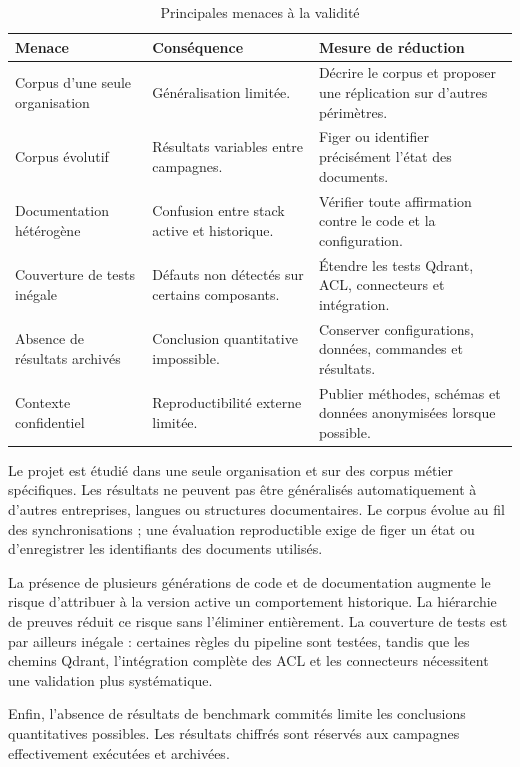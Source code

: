 \begin{table}[H]
\centering
\caption{Principales menaces à la validité}
\label{tab:menaces_validite}
\begin{tabular}{p{3.5cm}p{4.4cm}p{5.3cm}}
\toprule
\textbf{Menace} & \textbf{Conséquence} & \textbf{Mesure de réduction} \\
\midrule
Corpus d'une seule organisation & Généralisation limitée. & Décrire le corpus et proposer une réplication sur d'autres périmètres. \\
Corpus évolutif & Résultats variables entre campagnes. & Figer ou identifier précisément l'état des documents. \\
Documentation hétérogène & Confusion entre stack active et historique. & Vérifier toute affirmation contre le code et la configuration. \\
Couverture de tests inégale & Défauts non détectés sur certains composants. & Étendre les tests Qdrant, ACL, connecteurs et intégration. \\
Absence de résultats archivés & Conclusion quantitative impossible. & Conserver configurations, données, commandes et résultats. \\
Contexte confidentiel & Reproductibilité externe limitée. & Publier méthodes, schémas et données anonymisées lorsque possible. \\
\bottomrule
\end{tabular}
\end{table}

Le projet est étudié dans une seule organisation et sur des corpus métier spécifiques. Les résultats ne peuvent pas être généralisés automatiquement à d'autres entreprises, langues ou structures documentaires. Le corpus évolue au fil des synchronisations ; une évaluation reproductible exige de figer un état ou d'enregistrer les identifiants des documents utilisés.

La présence de plusieurs générations de code et de documentation augmente le risque d'attribuer à la version active un comportement historique. La hiérarchie de preuves réduit ce risque sans l'éliminer entièrement. La couverture de tests est par ailleurs inégale : certaines règles du pipeline sont testées, tandis que les chemins Qdrant, l'intégration complète des ACL et les connecteurs nécessitent une validation plus systématique.

Enfin, l'absence de résultats de benchmark commités limite les conclusions quantitatives possibles. Les résultats chiffrés sont réservés aux campagnes effectivement exécutées et archivées.

